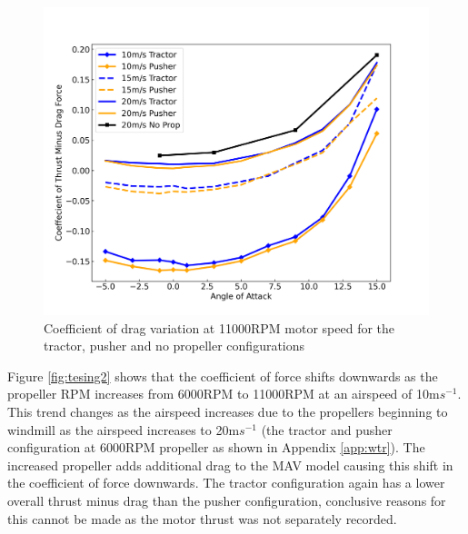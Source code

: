 \begin{figure}[H]
    \centering
    \includegraphics[scale = 0.45]{05_Results/Figs/Cd/110000RPM_Cd.png}
    \caption{Coefficient of drag variation at 11000RPM motor speed for the tractor, pusher and no propeller configurations}
    \label{fig:Cd_11000RPM}
\end{figure}

Figure \ref{fig:tesing2} shows that the coefficient of force shifts downwards as the propeller RPM increases from 6000RPM to 11000RPM at an airspeed of 10m$s^{-1}$. This trend changes as the airspeed increases due to the propellers beginning to windmill as the airspeed increases to 20m$s^{-1}$ (the tractor and pusher configuration at 6000RPM propeller as shown in Appendix \ref{app:wtr}). The increased propeller adds additional drag to the \acrshort{MAV} model causing this shift in the coefficient of force downwards. The tractor configuration again has a lower overall thrust minus drag than the pusher configuration, conclusive reasons for this cannot be made as the motor thrust was not separately recorded. 


